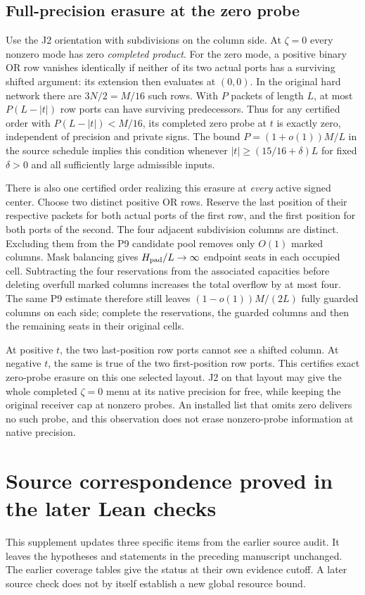 \documentclass[11pt,a4paper]{article}
\begin{document}
\subsection{Full-precision erasure at the zero probe}
Use the J2 orientation with subdivisions on the column side.
At \(\zeta=0\) every nonzero mode has zero \emph{completed product}.
For the zero mode, a positive binary OR row vanishes identically
if neither of its two actual ports has a surviving shifted argument:
its extension then evaluates at \((0,0)\). In the original hard
network there are \(3N/2=M/16\) such rows. With \(P\) packets of length
\(L\), at most \(P(L-|t|)\) row ports can have surviving predecessors.
Thus for any certified order with \(P(L-|t|)<M/16\), its completed
zero probe at \(t\) is exactly zero, independent of precision and
private signs. The bound \(P=(1+o(1))M/L\) in the source schedule
implies this condition whenever \(|t|\ge(15/16+\delta)L\) for fixed
\(\delta>0\) and all sufficiently large admissible inputs.

There is also one certified order realizing this erasure at
\emph{every} active signed center. Choose two distinct positive OR
rows. Reserve the last position of their respective packets for
both actual ports of the first row, and the first position for both
ports of the second. The four adjacent subdivision columns are
distinct. Excluding them from the P9 candidate pool removes only
\(O(1)\) marked columns. Mask balancing gives \(H_{\rm pad}/L\to\infty\)
endpoint seats in each occupied cell. Subtracting the four reservations
from the associated capacities before deleting overfull marked
columns increases the total overflow by at most four. The same P9
estimate therefore still leaves \((1-o(1))M/(2L)\) fully guarded
columns on each side; complete the reservations, the guarded columns
and then the remaining seats in their original cells.

At positive \(t\), the two last-position row ports cannot see a
shifted column. At negative \(t\), the same is true of the two
first-position row ports. This certifies exact zero-probe erasure
on this one selected layout. J2 on that layout may give the whole
completed \(\zeta=0\) menu at its native precision for free, while
keeping the original receiver cap at nonzero probes. An installed
list that omits zero delivers no such probe, and this observation
does not erase nonzero-probe information at native precision.


\clearpage
\section{Source correspondence proved in the later Lean checks}\label{r64-source-correspondence}
This supplement updates three specific items from the earlier source audit.
It leaves the hypotheses and statements in the preceding manuscript unchanged.
The earlier coverage tables give the status at their own evidence cutoff.
A later source check does not by itself establish a new global resource bound.
\end{document}
